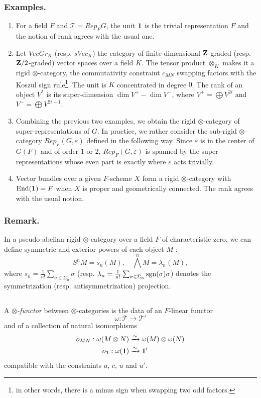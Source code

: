 \documentclass[../main.tex]{subfiles}
\begin{document}
\subsubsection{Examples.}
\begin{enumerate}[label=\arabic*)]
    \item For a field $F$ and $\mathcal{T} = Rep_F G$, the unit $\mathbf{1}$ is the trivial representation $F$ and the notion of rank agrees with the usual one.
    \item Let $VecGr_K$ (resp. $sVec_K$) the category of finite-dimensional $\mathbf{Z}$-graded (resp. $\mathbf{Z}/2$-graded) vector spaces over a field $K$.
    The tensor product $\otimes_K$ makes it a rigid $\otimes$-category, the commutativity constraint $c_{MN}$ swapping factors with the Koszul sign rule\footnote{in other words, there is a minus sign when swapping two odd factors.}. The unit is $K$ concentrated in degree $0$. The rank of an object $V^*$ is its super-dimension $\dim V^+ - \dim V^-$, where $V^+ = \bigoplus V^{2i}$ and $V^- = \bigoplus V^{2i+1}$.
    \item Combining the previous two examples, we obtain the rigid $\otimes$-category of super-representations of $G$. In practice, we rather consider the sub-rigid $\otimes$-category $Rep_F(G, \varepsilon)$ defined in the following way. Since $\varepsilon$ is in the center of $G(F)$ and of order $1$ or $2$, $Rep_F(G, \varepsilon)$ is spanned by the super-representations whose even part is exactly where $\varepsilon$ acts trivially.
    \item Vector bundles over a given $F$-scheme $X$ form a rigid $\otimes$-category with $\operatorname{End}(\mathbf{1}) = F$ when $X$ is proper and geometrically connected. The rank agrees with the usual notion.
\end{enumerate}

\subsubsection{Remark.} In a pseudo-abelian rigid $\otimes$-category over a field $F$ of characteristic zero, we can define symmetric and exterior powers of each object $M$ :
$$S^n M = s_n(M),\quad \bigwedge^n M = \lambda_n(M),$$
where $s_n = \frac{1}{n!} \sum_{\sigma \in \Sigma_n} \sigma$ (resp. $\lambda_n = \frac{1}{n!} \sum_{\sigma \in \Sigma_n} \mathrm{sgn}(\sigma)\sigma$) denotes the symmetrization (resp. antisymmetrization) projection.

\subsection{} A \emph{$\otimes$-functor} between $\otimes$-categories is the data of an $F$-linear functor
$$\omega : \mathcal{T} \to \mathcal{T}'$$
and of a collection of natural isomorphisms
\begin{align*}
    o_{MN} : \omega(M \otimes N) &\xrightarrow{\sim} \omega(M) \otimes \omega(N)\\
    o_{\mathbf{1}} : \omega(\mathbf{1}) &\xrightarrow{\sim} \mathbf{1}'
\end{align*}
compatible with the constraints $a$, $c$, $u$ and $u'$.
\end{document}
